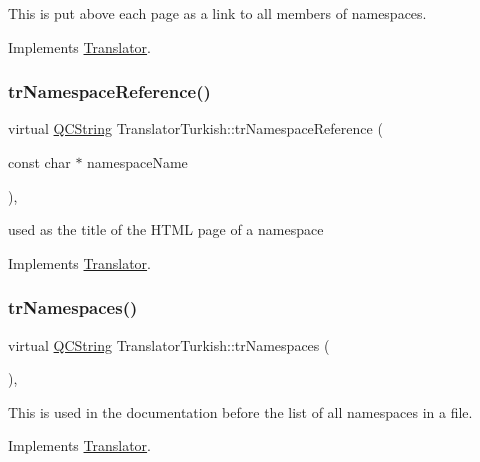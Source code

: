 This is put above each page as a link to all members of namespaces. 

Implements \mbox{\hyperlink{class_translator}{Translator}}.

\mbox{\label{class_translator_turkish_ab3e891dec22fc642ef07b74475994b82}} 
\subsubsection{\texorpdfstring{trNamespaceReference()}{trNamespaceReference()}}
{\footnotesize\ttfamily virtual \mbox{\hyperlink{class_q_c_string}{Q\+C\+String}} Translator\+Turkish\+::tr\+Namespace\+Reference (\begin{DoxyParamCaption}\item[{const char $\ast$}]{namespace\+Name }\end{DoxyParamCaption})\hspace{0.3cm}{\ttfamily [inline]}, {\ttfamily [virtual]}}

used as the title of the H\+T\+ML page of a namespace 

Implements \mbox{\hyperlink{class_translator}{Translator}}.

\mbox{\label{class_translator_turkish_a97c133e8953b95ec83fc164033f6af10}} 
\subsubsection{\texorpdfstring{trNamespaces()}{trNamespaces()}}
{\footnotesize\ttfamily virtual \mbox{\hyperlink{class_q_c_string}{Q\+C\+String}} Translator\+Turkish\+::tr\+Namespaces (\begin{DoxyParamCaption}{ }\end{DoxyParamCaption})\hspace{0.3cm}{\ttfamily [inline]}, {\ttfamily [virtual]}}

This is used in the documentation before the list of all namespaces in a file. 

Implements \mbox{\hyperlink{class_translator}{Translator}}.

\mbox{\label{class_translator_turkish_a4c731a9c91e85d6f7a9c1381303c870f}} 
